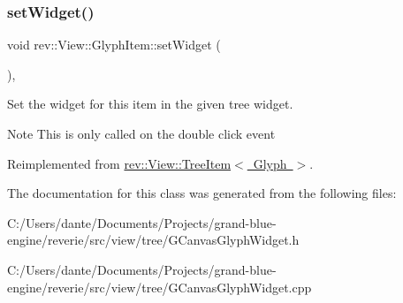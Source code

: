 \subsubsection{\texorpdfstring{setWidget()}{setWidget()}}
{\footnotesize\ttfamily void rev\+::\+View\+::\+Glyph\+Item\+::set\+Widget (\begin{DoxyParamCaption}{ }\end{DoxyParamCaption})\hspace{0.3cm}{\ttfamily [override]}, {\ttfamily [virtual]}}



Set the widget for this item in the given tree widget. 

\begin{DoxyNote}{Note}
This is only called on the double click event 
\end{DoxyNote}


Reimplemented from \mbox{\hyperlink{classrev_1_1_view_1_1_tree_item_a24faa4e374ec0728c7eda8f50ca575df}{rev\+::\+View\+::\+Tree\+Item$<$ Glyph $>$}}.



The documentation for this class was generated from the following files\+:\begin{DoxyCompactItemize}
\item 
C\+:/\+Users/dante/\+Documents/\+Projects/grand-\/blue-\/engine/reverie/src/view/tree/G\+Canvas\+Glyph\+Widget.\+h\item 
C\+:/\+Users/dante/\+Documents/\+Projects/grand-\/blue-\/engine/reverie/src/view/tree/G\+Canvas\+Glyph\+Widget.\+cpp\end{DoxyCompactItemize}
